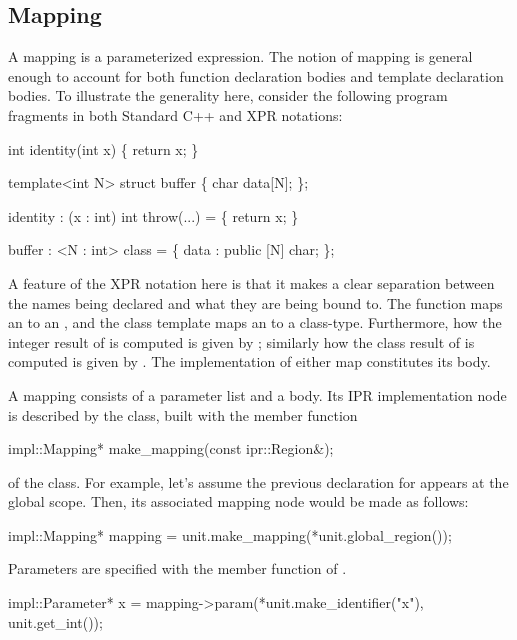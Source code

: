 \documentclass[11pt]{article}
\begin{document}
\subsection{Mapping}
\label{sec:fun-decl.mapping}

A mapping is a parameterized expression.   The notion of mapping is general
enough to account for both function declaration bodies and template
declaration bodies.  To illustrate the generality here, consider the following 
program fragments in both Standard C++ and XPR notations:
\begin{center}
\begin{minipage}[t]{13cm}
  \begin{minipage}[t]{4cm}
    \begin{Program}
int identity(int x) \{
  return x;
\}

template<int N>
struct buffer \{
   char data[N];
\};
    \end{Program}
  \end{minipage}\hfil \vrule \hfil
  \begin{minipage}[t]{7cm}
    \begin{Program}
identity : (x : int) int throw(...) = \{
  return x;
\}

buffer : <N : int> class = \{
  data : public [N] char;
\};
    \end{Program}
  \end{minipage}
\end{minipage}
\end{center}
A feature of the XPR notation here is that it makes a clear separation
between the names being declared and what they are being bound to.  The
function  maps an  to an , and the class
template  maps an  to a class-type.  Furthermore, how
the integer result of  is computed is given by 
; similarly how the class result of  is
computed is given by .  The implementation 
of either map constitutes its body.

A mapping consists of a parameter list and a body.  Its IPR implementation
node is described by the class, built with the member
function 
\begin{Program}
  impl::Mapping* make_mapping(const ipr::Region&);
\end{Program}
of the  class.  For example, let's assume the previous
declaration for  appears at the global scope.  Then, its
associated mapping node would be made as follows:
\begin{Program}
impl::Mapping* mapping = unit.make_mapping(*unit.global_region());  
\end{Program}
Parameters are specified with the  member function
of .  
\begin{Program}
impl::Parameter* x = mapping->param(*unit.make_identifier("x"), unit.get_int());
\end{Program}
\end{document}
